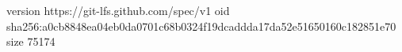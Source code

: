 version https://git-lfs.github.com/spec/v1
oid sha256:a0cb8848ea04eb0da0701c68b0324f19dcaddda17da52e51650160c182851e70
size 75174
